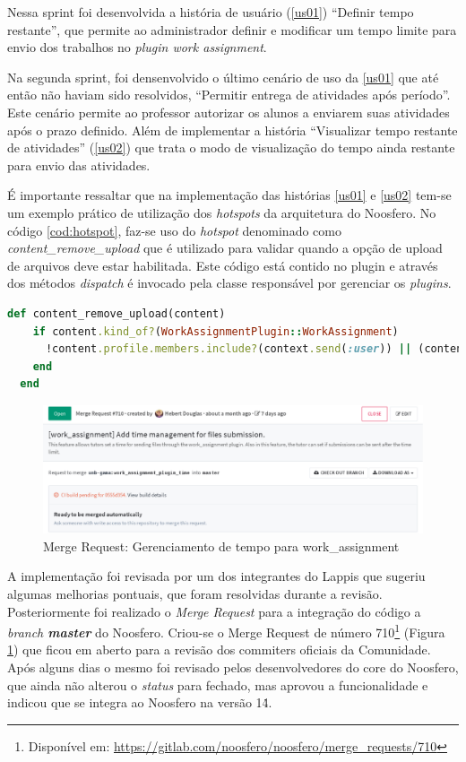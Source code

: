 Nessa sprint foi desenvolvida a história de usuário (\ref{us01}) ``Definir tempo restante'', que permite ao administrador definir e modificar um tempo limite para envio dos trabalhos no \textit{plugin work assignment}.

Na segunda sprint, foi densenvolvido o último cenário de uso da \ref{us01} que até então não haviam sido resolvidos, ``Permitir entrega de atividades após período''. Este cenário permite ao professor autorizar os alunos a enviarem suas atividades após o prazo definido. Além de implementar a história ``Visualizar tempo restante de atividades'' (\ref{us02}) que trata o modo de visualização do tempo ainda restante para envio das atividades.

É importante ressaltar que na implementação das histórias \ref{us01} e \ref{us02} tem-se um exemplo prático de utilização dos \textit{hotspots} da arquitetura do Noosfero. No código \ref{cod:hotspot}, faz-se uso do \textit{hotspot} denominado como \textit{content\_remove\_upload} que é utilizado para validar quando a opção de upload de arquivos deve estar habilitada. Este código está contido no plugin e através dos métodos \textit{dispatch} é invocado pela classe responsável por gerenciar os \textit{plugins}.

\begin{lstlisting}[language=Ruby, caption={Código de implementação do \textit{hotspot}}, label=cod:hotspot]
  def content_remove_upload(content)
    if content.kind_of?(WorkAssignmentPlugin::WorkAssignment)
      !content.profile.members.include?(context.send(:user)) || (content.expired? && !content.ignore_time)
    end
  end
\end{lstlisting}

\begin{figure}[h]
    \centering
    \includegraphics[keepaspectratio=true,scale=0.42]
      {figuras/merge-request710.eps}
    \caption{Merge Request: Gerenciamento de tempo para work\_assignment}
    \label{fig:merge-710}
\end{figure}

A implementação foi revisada por um dos integrantes do Lappis que sugeriu algumas melhorias pontuais, que foram resolvidas durante a revisão. Posteriormente foi realizado o \textit{Merge Request} para a integração do código a \textit{branch \textbf{master}} do Noosfero. Criou-se o Merge Request de número 710\footnote{Disponível em: \url{https://gitlab.com/noosfero/noosfero/merge_requests/710}} (Figura \ref{fig:merge-710}) que ficou em aberto para a revisão dos commiters oficiais da Comunidade. Após alguns dias o mesmo foi revisado pelos desenvolvedores do core do Noosfero, que ainda não alterou o \textit{status} para fechado, mas aprovou a funcionalidade e indicou que se integra ao Noosfero na versão 1\.4.

